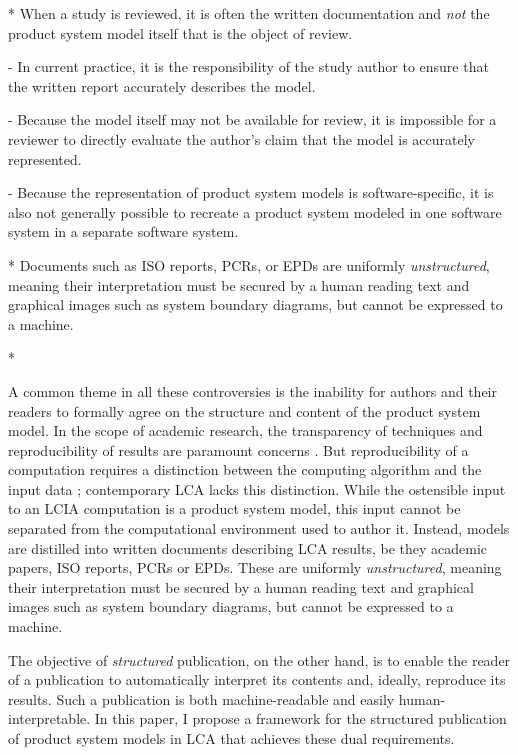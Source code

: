 * When a study is reviewed, it is often the written documentation and \emph{not} the product system model itself that is the object of review.  

  - In current practice, it is the responsibility of the study author to ensure that the written report accurately describes the model.  

  - Because the model itself may not be available for review, it is impossible for a reviewer to directly evaluate the author's claim that the model is accurately represented.

  - Because the representation of product system models is software-specific, it is also not generally possible to recreate a product system modeled in one software system in a separate software system.  

 * Documents such as ISO reports, PCRs, or EPDs are uniformly \textit{unstructured}, meaning their interpretation must be secured by a human reading text and graphical images such as system boundary diagrams, but cannot be expressed to a machine.  

 * 


\oldinput

A common theme in all these controversies is the inability for authors and their readers to formally agree on the structure and content of the product system model.  In the scope of academic research, the transparency of techniques and reproducibility of results are paramount concerns \citep{Mesirov_2010}.  But reproducibility of a computation requires a distinction between the computing algorithm and the input data \citep{Buckheit_1995, Fomel_2009}; contemporary LCA lacks this distinction.  While the ostensible input to an LCIA computation is a product system model, this input cannot be separated from the computational environment used to author it.  Instead, models are distilled into written documents describing LCA results, be they academic papers, ISO reports, PCRs or EPDs.  These are uniformly \textit{unstructured}, meaning their interpretation must be secured by a human reading text and graphical images such as system boundary diagrams, but cannot be expressed to a machine.  

The objective of \textit{structured} publication, on the other hand, is to enable the reader of a publication to automatically interpret its contents and, ideally, reproduce its results.  Such a publication is both machine-readable and easily human-interpretable.  In this paper, I propose a framework for the structured publication of product system models in LCA that achieves these dual requirements.  


\cruft




